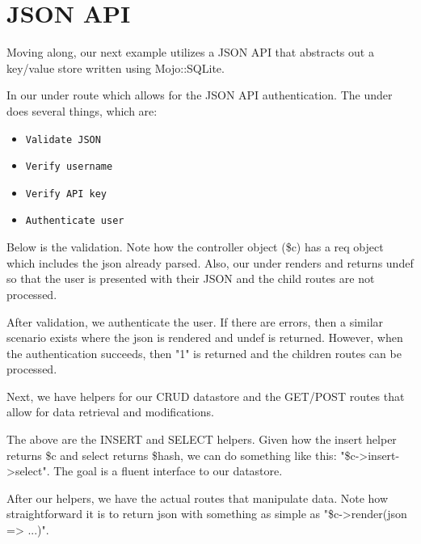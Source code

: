 \documentclass[14pt]{extreport}
\newcommand\Small{\fontsize{12}{13.0}\fontencoding{T1}\selectfont}
\newcommand*\LSTfont{\Small\ttfamily\SetTracking{encoding=*}{-60}\lsstyle}
\begin{document}
\section{JSON API}

Moving along, our next example utilizes a JSON API that abstracts out a
key/value store written using Mojo::SQLite.

In our under route which allows for the JSON API authentication.  The under
does several things, which are:

\begin{itemize} \itemsep1pt \parskip0pt 
\item \verb|Validate JSON|
\item \verb|Verify username|
\item \verb|Verify API key|
\item \verb|Authenticate user|
\end{itemize}

Below is the validation.  Note how the controller object (\$c) has a req object
which includes the json already parsed.  Also, our under renders and returns
undef so that the user is presented with their JSON and the child routes are
not processed.



After validation, we authenticate the user.  If there are errors, then a
similar scenario exists where the json is rendered and undef is returned.
However, when the authentication succeeds, then "1" is returned and the 
children routes can be processed.



Next, we have helpers for our CRUD datastore and the GET/POST routes that allow
for data retrieval and modifications.



The above are the INSERT and SELECT helpers.  Given how the insert helper returns \$c and
select returns \$hash, we can do something like this: "\$c->insert->select".  The goal
is a fluent interface to our datastore.



After our helpers, we have the actual routes that manipulate data.  Note how straightforward
it is to return json with something as simple as "\$c->render(json => ...)".
\end{document}
